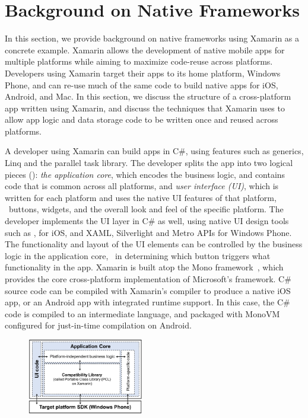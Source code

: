 \section{Background on Native Frameworks}
\label{section:background}

In this section, we provide background on native frameworks using Xamarin as a
concrete example.  Xamarin allows the development of native mobile apps for
multiple platforms while aiming to maximize code-reuse across platforms.
Developers using Xamarin target their apps to its home platform, Windows Phone,
and can re-use much of the same code to build native apps for iOS, Android, and
Mac. In this section, we discuss the structure of a cross-platform app written
using Xamarin, and discuss the techniques that Xamarin uses to allow app logic
and data storage code to be written once and reused across platforms.

A developer using Xamarin can build apps in C\#, using features such as
generics, Linq and the parallel task library. The developer splits the app into
two logical pieces (): \textit{the application core},
which encodes the business logic, and contains code that is common across all
platforms, and \textit{user interface (UI)}, which is written for each platform
and uses the native UI features of that platform, \eg~buttons, widgets, and the
overall look and feel of the specific platform. The developer implements the UI
layer in C\# as well, using native UI design tools such as
,  for iOS, and XAML, Silverlight and
Metro APIs for Windows Phone. The functionality and layout of the UI elements
can be controlled by the business logic in the application core, \eg~in
determining which button triggers what functionality in the app.  Xamarin is
built atop the Mono  framework~\cite{mono}, which provides the core
cross-platform implementation of Microsoft's  framework. C\# source
code can be compiled with Xamarin's compiler to produce a native iOS app, or an
Android app with integrated  runtime support. In this case, the C\#
code is compiled to an intermediate language, and packaged with MonoVM
configured for just-in-time compilation on Android.

\begin{figure}[t!]
\centering
\includegraphics[keepaspectratio=true,width=0.45\textwidth]{figures/appstruct.png}
{\label{figure:appstruct}}
\end{figure}

